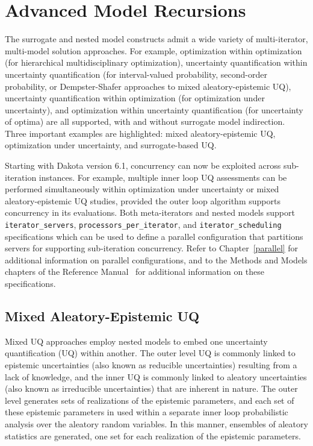 \chapter{Advanced Model Recursions} \label{adv_models}


The surrogate and nested model constructs admit a wide variety of
multi-iterator, multi-model solution approaches. For example,
optimization within optimization (for hierarchical multidisciplinary
optimization), uncertainty quantification within uncertainty
quantification (for interval-valued probability, second-order
probability, or Dempster-Shafer approaches to mixed aleatory-epistemic
UQ), uncertainty quantification within optimization (for optimization
under uncertainty), and optimization within uncertainty quantification
(for uncertainty of optima) are all supported, with and without
surrogate model indirection. Three important examples are highlighted:
mixed aleatory-epistemic UQ, optimization under uncertainty, and
surrogate-based UQ.

Starting with Dakota version 6.1, concurrency can now be exploited
across sub-iteration instances.  For example, multiple inner loop UQ
assessments can be performed simultaneously within optimization under
uncertainty or mixed aleatory-epistemic UQ studies, provided the outer
loop algorithm supports concurrency in its evaluations.  Both
meta-iterators and nested models support \texttt{iterator\_servers}, 
\texttt{processors\_per\_iterator}, and \texttt{iterator\_scheduling}
specifications which can be used to define a parallel configuration
that partitions servers for supporting sub-iteration concurrency.
Refer to Chapter~\ref{parallel} for additional information on parallel
configurations, and to the Methods and Models chapters of the Reference 
Manual~\cite{RefMan} for additional information on these specifications.


\section{Mixed Aleatory-Epistemic UQ} \label{adv_models:mixed_uq}

Mixed UQ approaches employ nested models to embed one uncertainty
quantification (UQ) within another. The outer level UQ is commonly
linked to epistemic uncertainties (also known as reducible
uncertainties) resulting from a lack of knowledge, and the inner UQ is
commonly linked to aleatory uncertainties (also known as irreducible
uncertainties) that are inherent in nature. The outer level generates
sets of realizations of the epistemic parameters, and each set of
these epistemic parameters in used within a separate inner loop
probabilistic analysis over the aleatory random variables. In this
manner, ensembles of aleatory statistics are generated, one set for
each realization of the epistemic parameters. %

